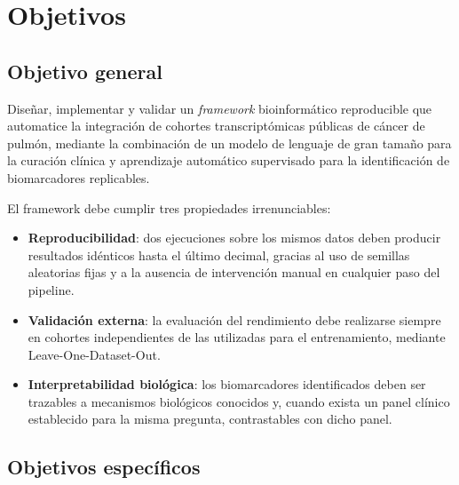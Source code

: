 \chapter*{Objetivos}
\label{cap:objetivos}
{}

\section*{Objetivo general}
{}

Diseñar, implementar y validar un \emph{framework} bioinformático
reproducible que automatice la integración de cohortes transcriptómicas
públicas de cáncer de pulmón, mediante la combinación de un modelo de
lenguaje de gran tamaño para la curación clínica y aprendizaje automático
supervisado para la identificación de biomarcadores replicables.

El framework debe cumplir tres propiedades irrenunciables:

\begin{itemize}
  \item \textbf{Reproducibilidad}: dos ejecuciones sobre los mismos datos
  deben producir resultados idénticos hasta el último decimal, gracias al
  uso de semillas aleatorias fijas y a la ausencia de intervención manual
  en cualquier paso del pipeline.
  \item \textbf{Validación externa}: la evaluación del rendimiento debe
  realizarse siempre en cohortes independientes de las utilizadas para el
  entrenamiento, mediante Leave-One-Dataset-Out.
  \item \textbf{Interpretabilidad biológica}: los biomarcadores
  identificados deben ser trazables a mecanismos biológicos conocidos y,
  cuando exista un panel clínico establecido para la misma pregunta,
  contrastables con dicho panel.
\end{itemize}

\section*{Objetivos específicos}
{}


